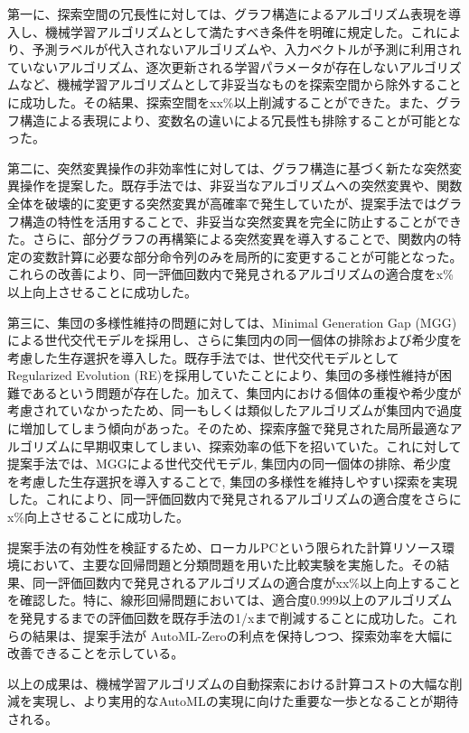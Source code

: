 \documentclass[11pt,oneside,openany,report]{jsbook}
\begin{document}
第一に、探索空間の冗長性に対しては、グラフ構造によるアルゴリズム表現を導入し、機械学習アルゴリズムとして満たすべき条件を明確に規定した。これにより、予測ラベルが代入されないアルゴリズムや、入力ベクトルが予測に利用されていないアルゴリズム、逐次更新される学習パラメータが存在しないアルゴリズムなど、機械学習アルゴリズムとして非妥当なものを探索空間から除外することに成功した。その結果、探索空間をxx\%以上削減することができた。また、グラフ構造による表現により、変数名の違いによる冗長性も排除することが可能となった。

第二に、突然変異操作の非効率性に対しては、グラフ構造に基づく新たな突然変異操作を提案した。既存手法では、非妥当なアルゴリズムへの突然変異や、関数全体を破壊的に変更する突然変異が高確率で発生していたが、提案手法ではグラフ構造の特性を活用することで、非妥当な突然変異を完全に防止することができた。さらに、部分グラフの再構築による突然変異を導入することで、関数内の特定の変数計算に必要な部分命令列のみを局所的に変更することが可能となった。これらの改善により、同一評価回数内で発見されるアルゴリズムの適合度をx\%以上向上させることに成功した。

第三に、集団の多様性維持の問題に対しては、Minimal Generation Gap (MGG)による世代交代モデルを採用し、さらに集団内の同一個体の排除および希少度を考慮した生存選択を導入した。既存手法では、世代交代モデルとしてRegularized Evolution (RE)を採用していたことにより、集団の多様性維持が困難であるという問題が存在した。加えて、集団内における個体の重複や希少度が考慮されていなかったため、同一もしくは類似したアルゴリズムが集団内で過度に増加してしまう傾向があった。そのため、探索序盤で発見された局所最適なアルゴリズムに早期収束してしまい、探索効率の低下を招いていた。これに対して提案手法では、MGGによる世代交代モデル, 集団内の同一個体の排除、希少度を考慮した生存選択を導入することで, 集団の多様性を維持しやすい探索を実現した。これにより、同一評価回数内で発見されるアルゴリズムの適合度をさらにx\%向上させることに成功した。

提案手法の有効性を検証するため、ローカルPCという限られた計算リソース環境において、主要な回帰問題と分類問題を用いた比較実験を実施した。その結果、同一評価回数内で発見されるアルゴリズムの適合度がxx\%以上向上することを確認した。特に、線形回帰問題においては、適合度0.999以上のアルゴリズムを発見するまでの評価回数を既存手法の1/xまで削減することに成功した。これらの結果は、提案手法が AutoML-Zeroの利点を保持しつつ、探索効率を大幅に改善できることを示している。

以上の成果は、機械学習アルゴリズムの自動探索における計算コストの大幅な削減を実現し、より実用的なAutoMLの実現に向けた重要な一歩となることが期待される。
\end{document}
